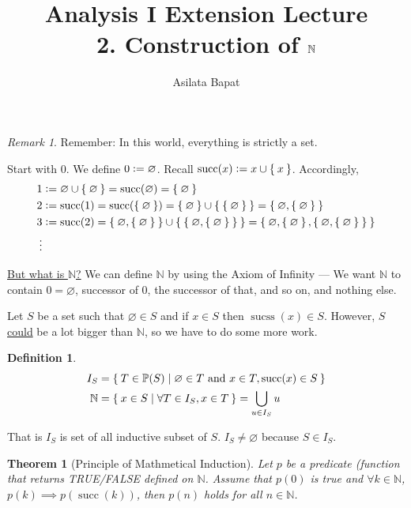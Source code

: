 \documentclass[12pt]{amsart}
\title[Construction of $\bbN$]
	{Analysis I Extension Lecture\\2. Construction of $\bbN$}
\author{Asilata Bapat}
\newcommand{\bbN}{\mathbb{N}}
\theoremstyle{plain}
\newtheorem*{thm}{Theorem}
\theoremstyle{remark}
\newtheorem*{rmk}{Remark}
\theoremstyle{definition}
\newtheorem*{define}{Definition}
\begin{document}
\maketitle
{}

\begin{rmk}
	Remember: In this world, everything is strictly a set.
\end{rmk}

Start with $0$. We define $0 \vcentcolon = \varnothing$.
Recall $\operatorname{succ}(x) \vcentcolon = x \cup \Set{x}$. 
Accordingly,
\begin{align*}
	1 &\vcentcolon = \varnothing \cup \Set{\varnothing} = \operatorname{succ}(\varnothing) = \Set{\varnothing}\\
	2 &\vcentcolon = \operatorname{succ}(1) = \operatorname{succ}(\Set{\varnothing}) = \Set{\varnothing} \cup \Set{\Set{\varnothing}} = \Set{\varnothing, \Set{\varnothing}}\\
	3 &\vcentcolon = \operatorname{succ}(2) = \Set{\varnothing, \Set{\varnothing}} \cup \Set{\Set{\varnothing, \Set{\varnothing}}} = \Set{\varnothing, \Set{\varnothing}, \Set{\varnothing, \Set{\varnothing}}}\\
	\vdots
\end{align*}

\ul{But what is $\bbN$?} We can define $\bbN$ by using the Axiom of Infinity --- We want $\bbN$ to contain $0 = \varnothing$, successor of $0$, the successor of that, and so on, and nothing else. 
\newline

Let $S$ be a set such that $\varnothing \in S$ and if $x \in S$ then $\operatorname{sucss}(x) \in S$. However, $S$ \ul{could} be a lot bigger than $\bbN$, so we have to do some more work. 

\begin{define}
	\begin{align*}
		I_S &= \Set{T \in \mathbb{P}(S)| \varnothing \in T \mbox{ and } x \in T,\operatorname{succ}(x) \in S}\\
		\bbN &= \Set{x \in S | \forall T \in I_S, x \in T} =  \bigcup\limits_{u \in I_S} u
	\end{align*}
\end{define}
That is $I_S$ is set of all inductive subset of $S$. $I_S \neq \varnothing$ because $S \in I_S$.

\begin{thm}[Principle of Mathmetical Induction]
	Let $p$ be a predicate (function that returns TRUE/FALSE defined on $\bbN$.
		Assume that $p(0)$ is true and $\forall k \in \bbN$, $p(k) \implies p(\operatorname{succ}(k))$, then $p(n)$ holds for all $n \in \bbN$.
\end{thm}
\end{document}
